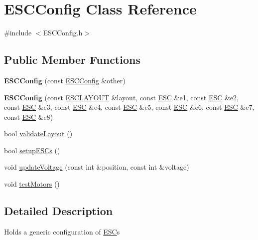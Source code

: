 \hypertarget{classESCConfig}{}\section{E\+S\+C\+Config Class Reference}
\label{classESCConfig}


{\ttfamily \#include $<$E\+S\+C\+Config.\+h$>$}

\subsection*{Public Member Functions}
\begin{DoxyCompactItemize}
\item 
\hypertarget{classESCConfig_a051e5887d427d0af841b350a3d17ed0b}{}{\bfseries E\+S\+C\+Config} (const \hyperlink{classESCConfig}{E\+S\+C\+Config} \&other)\label{classESCConfig_a051e5887d427d0af841b350a3d17ed0b}

\item 
\hypertarget{classESCConfig_ae99857939f404c71e164fdbf33088fd7}{}{\bfseries E\+S\+C\+Config} (const \hyperlink{ESCConfig_8h_a5e548692e60a92e800ad2e715a9f2303}{E\+S\+C\+L\+A\+Y\+O\+U\+T} \&layout, const \hyperlink{classESC}{E\+S\+C} \&e1, const \hyperlink{classESC}{E\+S\+C} \&e2, const \hyperlink{classESC}{E\+S\+C} \&e3, const \hyperlink{classESC}{E\+S\+C} \&e4, const \hyperlink{classESC}{E\+S\+C} \&e5, const \hyperlink{classESC}{E\+S\+C} \&e6, const \hyperlink{classESC}{E\+S\+C} \&e7, const \hyperlink{classESC}{E\+S\+C} \&e8)\label{classESCConfig_ae99857939f404c71e164fdbf33088fd7}

\item 
bool \hyperlink{classESCConfig_a4224f98b7b7b376cbb9623443a7759a5}{validate\+Layout} ()
\item 
bool \hyperlink{classESCConfig_a8c62f46613d4de2fb8ec0d086640a2c0}{setup\+E\+S\+Cs} ()
\item 
void \hyperlink{classESCConfig_af252e16ddc1298fdaf80731b5ac7a783}{update\+Voltage} (const int \&position, const int \&voltage)
\item 
void \hyperlink{classESCConfig_aacf261c1a05951b8dee6394e81af41a9}{test\+Motors} ()
\end{DoxyCompactItemize}


\subsection{Detailed Description}
Holds a generic configuration of \hyperlink{classESC}{E\+S\+C}\textquotesingle{}s 


